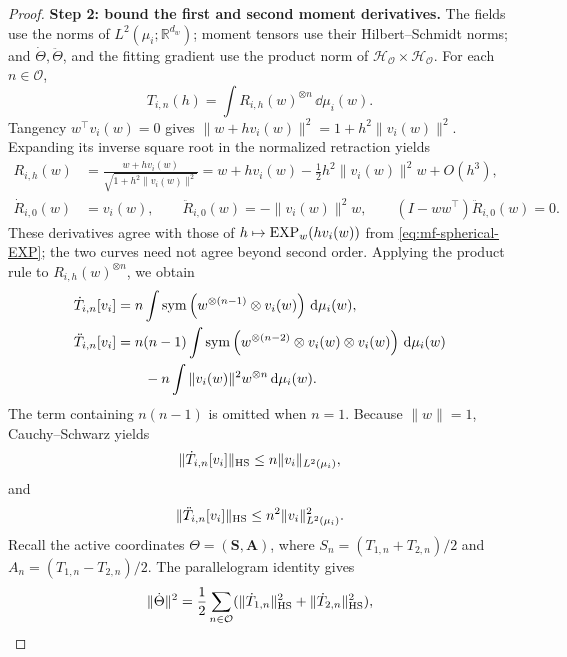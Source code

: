 \begin{proof}
\par\noindent\textbf{Step 2: bound the first and second moment derivatives.}
The fields use the norms of \(L^2(\mu_i;\mathbb R^{d_w})\); moment tensors
use their Hilbert--Schmidt norms; and \(\dot\Theta,\ddot\Theta\), and the
fitting gradient use the product norm of
\(\mathcal H_{\mathcal O}\times\mathcal H_{\mathcal O}\).
For each \(n\in\mathcal O\),
\[
    T_{i,n}(h)
    =
    \int R_{i,h}(w)^{\otimes n}\,\dd\mu_i(w).
\]
Tangency \(w^\top v_i(w)=0\) gives
\(\|w+hv_i(w)\|^2=1+h^2\|v_i(w)\|^2\). Expanding its inverse square
root in the normalized retraction yields
\begin{equation}
\label{eq:mf-retraction-second-jet}
\begin{aligned}
 R_{i,h}(w)&=\frac{w+hv_i(w)}{\sqrt{1+h^2\|v_i(w)\|^2}}
 =w+hv_i(w)-\tfrac12h^2\|v_i(w)\|^2w+O(h^3),\\
 \dot R_{i,0}(w)&=v_i(w),\qquad
 \ddot R_{i,0}(w)=-\|v_i(w)\|^2w,\qquad
 (I-ww^\top)\ddot R_{i,0}(w)=0.
\end{aligned}
\end{equation}
These derivatives agree with those of \(h\mapsto\mathrm{EXP}_w(hv_i(w))\)
from \cref{eq:mf-spherical-EXP}; the two curves need not agree beyond
second order. Applying the product rule to \(R_{i,h}(w)^{\otimes n}\),
we obtain
\begin{align}
    \dot T_{i,n}[v_i]
    &=
    n\int
    \mathrm{sym}\left({w^{\otimes(n-1)}\otimes v_i(w)}\right)
    \,\dd\mu_i(w),
    \\
    \ddot T_{i,n}[v_i]
    &=
    n(n-1)\int
    \mathrm{sym}\left({w^{\otimes(n-2)}
        \otimes v_i(w)\otimes v_i(w)}\right)
    \,\dd\mu_i(w)
    \\
    &\qquad
    -
    n\int
    \|v_i(w)\|^2 w^{\otimes n}
    \,\dd\mu_i(w).
\end{align}
The term containing \(n(n-1)\) is omitted when \(n=1\).
Because \(\|w\|=1\), Cauchy--Schwarz yields
\begin{equation}
\label{eq:dot-T-bound-fit-smoothness}
    \|\dot T_{i,n}[v_i]\|_{\mathrm{HS}}
    \le
    n\|v_i\|_{L^2(\mu_i)},
\end{equation}
and
\begin{equation}
\label{eq:ddot-T-bound-fit-smoothness}
    \|\ddot T_{i,n}[v_i]\|_{\mathrm{HS}}
    \le
    n^2\|v_i\|_{L^2(\mu_i)}^2.
\end{equation}
Recall the active coordinates \(\Theta=(\mathbf S,\mathbf A)\), where
\(S_n=(T_{1,n}+T_{2,n})/2\) and \(A_n=(T_{1,n}-T_{2,n})/2\).
The parallelogram identity gives
\[
 \|\dot\Theta\|^2=\frac12\sum_{n\in\mathcal O}
       (\|\dot T_{1,n}\|_{\mathrm{HS}}^2+\|\dot T_{2,n}\|_{\mathrm{HS}}^2),
\]
\end{proof}
